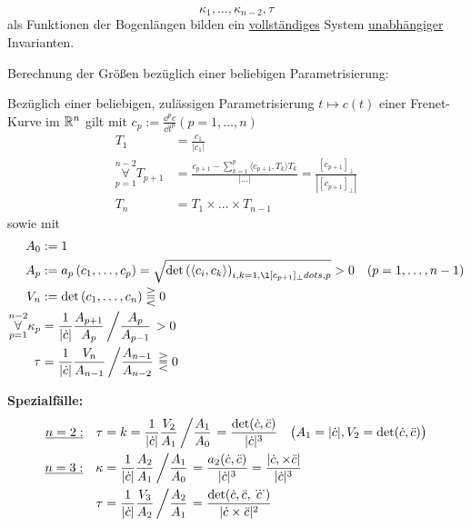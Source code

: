 \begin{satz}[Fundamentalsatz]\label{satz142}
\[\kappa_1, \ldots, \kappa_{n-2}, \tau\] 
als Funktionen der Bogenlängen bilden ein \uline{vollständiges} System  \uline{unabhängiger} Invarianten.
\end{satz}
Berechnung der Größen bezüglich einer beliebigen Parametrisierung:
\begin{folgerung}
Bezüglich einer beliebigen, zulässigen Parametrisierung \(t \mapsto c(t)\) einer Frenet-Kurve im \(\mathbb{R}^n\) gilt mit \(c_p:=\frac{\dd^p c}{\dd t^p} (p=1, \dots , n)\)
\begin{align*}
 T_1 &=\frac{c_1}{|c_1|} \\
 \overset{n-2}{\underset{p=1}{\forall}} T_{p+1} &= \frac{c_{p+1} - \sum_{k=1}^p \langle c_{p+1}, T_k \rangle T_k}{| \dots |} = \frac{[c_{p+1}]_{\perp}}{\left| [c_{p+1}]_{\perp} \right|} \\
 T_n &= T_1 \times \ldots \times T_{n-1}
\end{align*}
sowie mit
\begin{align*}
 A_0 &:= 1\\
 A_p &:= a_p \left(c_1, \ldots , c_p \right) = \sqrt{\det \left( \langle c_i, c_k \rangle \right)_{i,k = 1, \l[c_{p+1}]_{\perp}dots , p}} > 0 \quad (p = 1, \ldots, n-1)\\
 V_n &:= \det \left(c_1, \ldots , c_n \right) \gtreqqless 0\\
 \overset{n-2}{\underset{p=1}{\forall}} \kappa_p &= \frac{1}{|\dot c|} \frac{A_{p+1}}{A_p} \left/\frac{A_p}{A_{p-1}}\right.  > 0\\
 \tau &= \frac{1}{|\dot c|} \frac{V_n}{A_{n-1}}\left/\frac{A_{n-1}}{A_{n-2}} \right. \gtreqqless 0
\end{align*}
\end{folgerung}
\textbf{Spezialfälle:}\\
\begin{align*}
\uline{n=2:}\quad \tau &= k = \frac{1}{|\dot c|} \frac{V_2}{A_1}\left/\frac{A_1}{A_0}\right. = \frac{\det(\dot c, \ddot c)}{|\dot c|^3} \quad \big(A_1 = |\dot c|, V_2 = \det (\dot c, \ddot c)\big) \\
\uline{n=3:}\quad \kappa &= \frac{1}{|\dot c|} \frac{A_2}{A_1}\left/\frac{A_1}{A_0} \right. = \frac{a_2 (\dot c, \ddot c)}{|\dot c|^3} = \frac{|\dot c, \times \ddot c|}{|\dot c|^3} \\
\tau &= \frac{1}{|\dot c|} \frac{V_3}{A_2}\left/\frac{A_2}{A_1} \right. = \frac{\det (\dot c, \ddot c, \dddot c)}{|\dot c\times \ddot c|^2} 
\end{align*}
